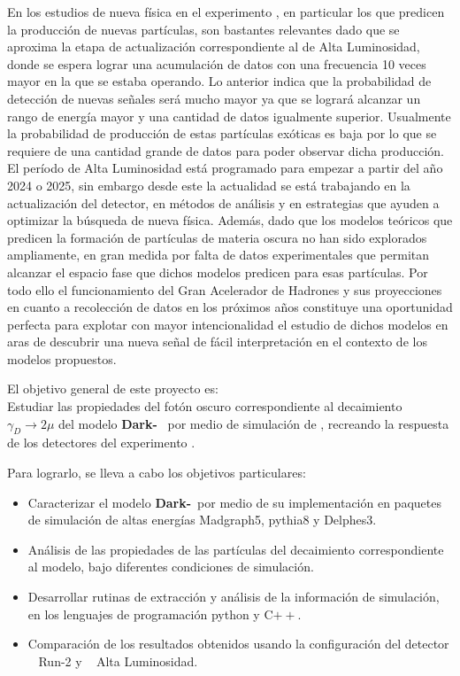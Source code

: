 En los estudios de nueva física en el experimento \LHC, en particular los que predicen la producción de nuevas partículas, son bastantes relevantes dado que se aproxima la etapa de actualización correspondiente al de Alta Luminosidad, donde se espera lograr una acumulación de datos con una frecuencia 10 veces mayor en la que se estaba operando. Lo anterior indica que la probabilidad de detección de nuevas señales será mucho mayor ya que se logrará alcanzar un rango de energía mayor y una cantidad de datos igualmente superior. Usualmente la probabilidad de producción de estas partículas exóticas es baja por lo que se requiere de una cantidad grande de datos para poder observar dicha producción. El período de Alta Luminosidad está programado para empezar a partir del año 2024 o 2025, sin embargo desde este la actualidad se está trabajando en la actualización del detector, en métodos de análisis y en estrategias que ayuden a optimizar la búsqueda de nueva física. Además, dado que los modelos teóricos que predicen la formación de partículas de materia oscura no han sido explorados ampliamente, en gran medida por falta de datos experimentales que permitan alcanzar el espacio fase que dichos modelos predicen para esas partículas. Por todo ello el funcionamiento del Gran Acelerador de Hadrones y sus proyecciones en cuanto a recolección de datos en los próximos años constituye una oportunidad perfecta para explotar con mayor intencionalidad el estudio de dichos modelos en aras de descubrir una nueva señal de fácil interpretación en el contexto de los modelos propuestos. 

El objetivo general de este proyecto es:\\
Estudiar las propiedades del fotón oscuro correspondiente al decaimiento $\gamma_D \rightarrow 2\mu$ del modelo \textbf{Dark-}\SUSY ~ por medio de simulación de \MC, recreando la respuesta de los detectores del experimento \CMS.

Para lograrlo, se lleva a cabo los objetivos particulares:
\begin{itemize}
\item Caracterizar el modelo \textbf{Dark-}\SUSY~por medio de su implementación en paquetes de simulación de altas energías Madgraph5, pythia8 y Delphes3.
\item Análisis de las propiedades de las partículas del decaimiento correspondiente al modelo, bajo diferentes condiciones de simulación.
\item Desarrollar rutinas de extracción y análisis de la información de simulación, en los lenguajes de programación python y C${++}$. 

\item Comparación de los resultados obtenidos usando la configuración del detector \CMS ~ Run-2 y \CMS~ Alta Luminosidad.
\end{itemize}


